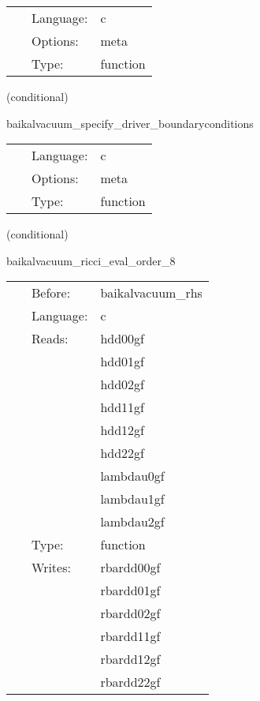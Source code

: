 \hspace{5mm}

 \begin{tabular*}{160mm}{cll} 
~ & Language:  & c \\ 
~ & Options:  & meta \\ 
~ & Type:  & function \\ 
\end{tabular*} 


\vspace{5mm}

   (conditional) 

\hspace{5mm} baikalvacuum\_specify\_driver\_boundaryconditions 

\hspace{5mm}{\it register boundary conditions in presync bin driver\_boundaryselect. } 


\hspace{5mm}

 \begin{tabular*}{160mm}{cll} 
~ & Language:  & c \\ 
~ & Options:  & meta \\ 
~ & Type:  & function \\ 
\end{tabular*} 


\vspace{5mm}

   (conditional) 

\hspace{5mm} baikalvacuum\_ricci\_eval\_order\_8 

\hspace{5mm}{\it compute ricci tensor, needed for bssn rhss, at finite-differencing order 8 } 


\hspace{5mm}

 \begin{tabular*}{160mm}{cll} 
~ & Before:  & baikalvacuum\_rhs \\ 
~ & Language:  & c \\ 
~ & Reads:  & hdd00gf \\ 
~& ~ &hdd01gf\\ 
~& ~ &hdd02gf\\ 
~& ~ &hdd11gf\\ 
~& ~ &hdd12gf\\ 
~& ~ &hdd22gf\\ 
~& ~ &lambdau0gf\\ 
~& ~ &lambdau1gf\\ 
~& ~ &lambdau2gf\\ 
~ & Type:  & function \\ 
~ & Writes:  & rbardd00gf \\ 
~& ~ &rbardd01gf\\ 
~& ~ &rbardd02gf\\ 
~& ~ &rbardd11gf\\ 
~& ~ &rbardd12gf\\ 
~& ~ &rbardd22gf\\ 
\end{tabular*} 


